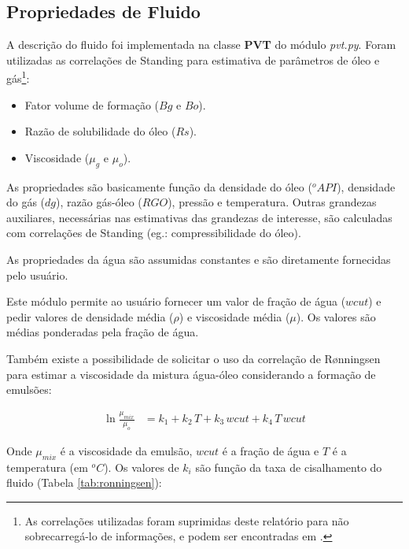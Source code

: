 \documentclass[final,5p]{elsarticle}
\numberwithin{equation}{section}
\begin{document}
    \subsection{Propriedades de Fluido}

        A descrição do fluido foi implementada na classe \textbf{PVT} do módulo \emph{pvt.py}. Foram utilizadas as correlações de Standing\cite{standing1952volumetric} para estimativa de parâmetros de óleo e gás\footnote{As correlações utilizadas foram suprimidas deste relatório para não sobrecarregá-lo de informações, e podem ser encontradas em \cite{rosa2006engenharia}.}:

        \begin{itemize}
            \item Fator volume de formação ($Bg$ e $Bo$).
            \item Razão de solubilidade do óleo ($Rs$).
            \item Viscosidade ($\mu_g$ e $\mu_o$).
        \end{itemize}

        As propriedades são basicamente função da densidade do óleo ($^oAPI$), densidade do gás ($dg$), razão gás-óleo ($RGO$), pressão e temperatura. Outras grandezas auxiliares, necessárias nas estimativas das grandezas de interesse, são calculadas com correlações de Standing (eg.: compressibilidade do óleo).

        As propriedades da água são assumidas constantes e são diretamente fornecidas pelo usuário.

        Este módulo permite ao usuário fornecer um valor de fração de água ($wcut$) e pedir valores de densidade média ($\rho$) e viscosidade média ($\mu$). Os valores são médias ponderadas pela fração de água.

        Também existe a possibilidade de solicitar o uso da correlação de Rønningsen para estimar a viscosidade da mistura água-óleo considerando a formação de emulsões\cite{doi:10.1021/ef00041a001}:

        \begin{align}
            \ln \frac{\mu_{mix}}{\mu_o} &= k_1 + k_2 \, T + k_3 \, wcut  + k_4 \, T \, wcut
        \end{align}

        Onde $\mu_{mix}$ é a viscosidade da emulsão, $wcut$ é a fração de água e $T$ é a temperatura (em $^oC$). Os valores de $k_i$ são função da taxa de cisalhamento do fluido (Tabela \ref{tab:ronningsen}):
\end{document}
